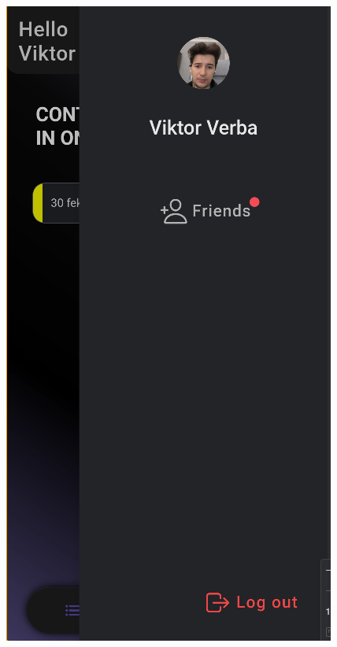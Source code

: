 \documentclass[12pt]{report}
\begin{document}
\begin{figure}[H]
\begin{minipage}[t]{0.25\textwidth}
    \end{minipage}
    \hfill
    \begin{minipage}[t]{0.25\textwidth}
        \centering
        \includegraphics[width=\linewidth]{src/friendrequest2.png}
    \end{minipage}
    \hfill

\end{figure}
\end{document}
